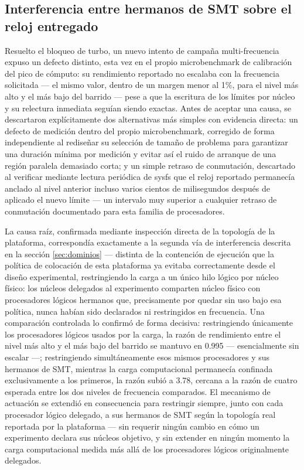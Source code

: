 \documentclass[12pt,oneside,spanish]{book}
\begin{document}
\subsection{Interferencia entre hermanos de SMT sobre el reloj entregado}
\label{sec:resultados-smt-siblings}

Resuelto el bloqueo de turbo, un nuevo intento de campaña multi-frecuencia expuso un defecto distinto, esta vez en el propio microbenchmark de calibración del pico de cómputo: su rendimiento reportado no escalaba con la frecuencia solicitada --- el mismo valor, dentro de un margen menor al 1\%, para el nivel más alto y el más bajo del barrido --- pese a que la escritura de los límites por núcleo y su relectura inmediata seguían siendo exactas. Antes de aceptar una causa, se descartaron explícitamente dos alternativas más simples con evidencia directa: un defecto de medición dentro del propio microbenchmark, corregido de forma independiente al rediseñar su selección de tamaño de problema para garantizar una duración mínima por medición y evitar así el ruido de arranque de una región paralela demasiado corta; y un simple retraso de conmutación, descartado al verificar mediante lectura periódica de sysfs que el reloj reportado permanecía anclado al nivel anterior incluso varios cientos de milisegundos después de aplicado el nuevo límite --- un intervalo muy superior a cualquier retraso de conmutación documentado para esta familia de procesadores.

La causa raíz, confirmada mediante inspección directa de la topología de la plataforma, correspondía exactamente a la segunda vía de interferencia descrita en la sección \ref{sec:dominios} --- distinta de la contención de ejecución que la política de colocación de esta plataforma ya evitaba correctamente desde el diseño experimental, restringiendo la carga a un único hilo lógico por núcleo físico: los núcleos delegados al experimento comparten núcleo físico con procesadores lógicos hermanos que, precisamente por quedar sin uso bajo esa política, nunca habían sido declarados ni restringidos en frecuencia. Una comparación controlada lo confirmó de forma decisiva: restringiendo únicamente los procesadores lógicos usados por la carga, la razón de rendimiento entre el nivel más alto y el más bajo del barrido se mantuvo en 0.995 --- esencialmente sin escalar ---; restringiendo simultáneamente esos mismos procesadores y sus hermanos de SMT, mientras la carga computacional permanecía confinada exclusivamente a los primeros, la razón subió a 3.78, cercana a la razón de cuatro esperada entre los dos niveles de frecuencia comparados. El mecanismo de actuación se extendió en consecuencia para restringir siempre, junto con cada procesador lógico delegado, a sus hermanos de SMT según la topología real reportada por la plataforma --- sin requerir ningún cambio en cómo un experimento declara sus núcleos objetivo, y sin extender en ningún momento la carga computacional medida más allá de los procesadores lógicos originalmente delegados.
\end{document}
